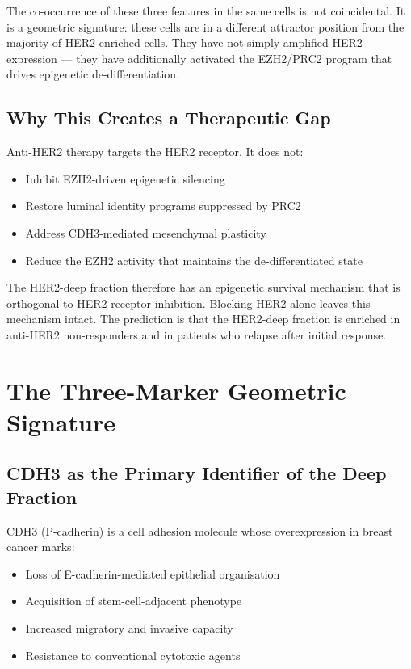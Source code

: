 \documentclass[12pt, a4paper]{article}
\begin{document}
\vspace{0.5em}

The co-occurrence of these three features
in the same cells is not coincidental.
It is a geometric signature: these cells
are in a different attractor position
from the majority of HER2-enriched cells.
They have not simply amplified HER2
expression --- they have additionally
activated the EZH2/PRC2 program that
drives epigenetic de-differentiation.

\subsection{Why This Creates a Therapeutic
Gap}

Anti-HER2 therapy targets the HER2 receptor.
It does not:
\begin{itemize}
    \item Inhibit EZH2-driven epigenetic
    silencing
    \item Restore luminal identity programs
    suppressed by PRC2
    \item Address CDH3-mediated mesenchymal
    plasticity
    \item Reduce the EZH2 activity that
    maintains the de-differentiated state
\end{itemize}

The HER2-deep fraction therefore has an
epigenetic survival mechanism that is
orthogonal to HER2 receptor inhibition.
Blocking HER2 alone leaves this mechanism
intact. The prediction is that the HER2-deep
fraction is enriched in anti-HER2
non-responders and in patients who relapse
after initial response.

\section{The Three-Marker Geometric Signature}

\subsection{CDH3 as the Primary Identifier
of the Deep Fraction}

CDH3 (P-cadherin) is a cell adhesion molecule
whose overexpression in breast cancer marks:
\begin{itemize}
    \item Loss of E-cadherin-mediated
    epithelial organisation
    \item Acquisition of stem-cell-adjacent
    phenotype
    \item Increased migratory and invasive
    capacity
    \item Resistance to conventional
    cytotoxic agents
\end{itemize}
\end{document}
